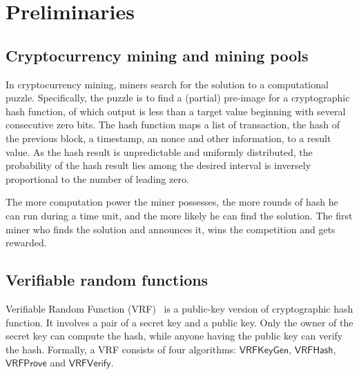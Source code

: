 \section{Preliminaries}

\subsection{Cryptocurrency mining and mining pools}



In cryptocurrency mining, miners search for the solution to a computational puzzle.
Specifically, the puzzle is to find a (partial) pre-image for a cryptographic hash function, of which output is less than a target value beginning with several consecutive zero bits.
The hash function maps a list of transaction, the hash of the previous block, a timestamp, an nonce and other information, to a result value.
As the hash result is unpredictable and uniformly distributed, the probability of the hash result lies among the desired interval is inversely proportional to the number of leading zero.

The more computation power the miner possesses, the more rounds of hash he can run during a time unit, and the more likely he can find the solution. The first miner who finds the solution and announces it, wins the competition and gets rewarded.




\subsection{Verifiable random functions}

Verifiable Random Function (VRF)~\cite{micali1999verifiable} is a public-key version of cryptographic hash function.
It involves a pair of a secret key and a public key.
Only the owner of the secret key can compute the hash, while anyone having the public key can verify the hash.
Formally, a VRF consists of four algorithms: $\mathsf{VRFKeyGen}$, $\mathsf{VRFHash}$, $\mathsf{VRFProve}$ and $\mathsf{VRFVerify}$.

